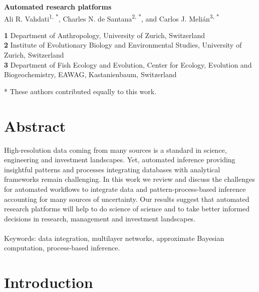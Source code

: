 \documentclass[english,12pt]{article}
\date{}
\begin{document}
\begin{flushleft}
  \textbf{\Large Automated research platforms}\\
  \vspace{0.5cm} Ali R. Vahdati\textsuperscript{1, *}, \vspace{0.5cm}
  Charles N. de Santana\textsuperscript{2, *}, and Carlos
  J. Meli\'an\textsuperscript{3, *}

\textbf{1} Department of Anthropology, University of Zurich, Switzerland\\
\textbf{2} Institute of Evolutionary Biology and Environmental Studies, University of Zurich, Switzerland\\
\textbf{3} Department of Fish Ecology and Evolution, Center for Ecology, Evolution and Biogeochemistry, EAWAG, Kastanienbaum, Switzerland
\\
\bigskip
\end{flushleft}
* These authors contributed equally to this work.\\
\newpage


\tableofcontents
\newpage

\section{Abstract}
High-resolution data coming from many sources is a standard in
science, engineering and investment landscapes. Yet, automated
inference providing insightful patterns and processes integrating
databases with analytical frameworks remain challenging. In this work
we review and discuss the challenges for automated workflows to
integrate data and pattern-process-based inference accounting for many
sources of uncertainty. Our results suggest that automated research
platforms will help to do science of science and to take better
informed decisions in research, management and investment landscapes.
\\
\\
Keywords: data integration, multilayer networks, approximate Bayesian
computation, process-based inference.
\newpage


\section{Introduction}
\end{document}
